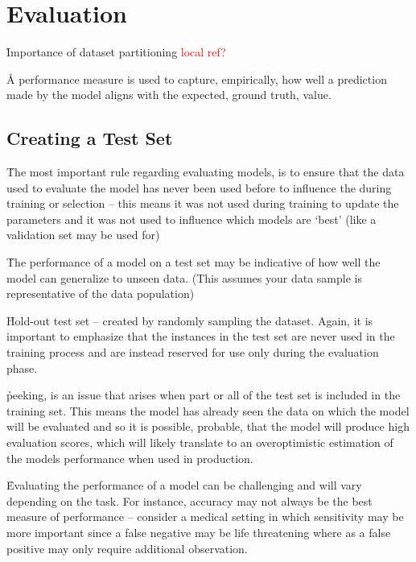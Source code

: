 \section{Evaluation}

\r{Importance of dataset partitioning \textcolor{red}{local ref?}}


\r{A performance measure is used to capture, empirically, how well a prediction made by the model aligns with the expected, ground truth, value.}

\subsection{Creating a Test Set}

\r{The most important rule regarding evaluating models, is to ensure that the data used to evaluate the model has never been used before to influence the during training or selection -- this means it was not used during training to update the parameters and it was not used to influence which models are `best' (like a validation set may be used for)}

\r{The performance of a model on a test set may be indicative of how well the model can generalize to unseen data. (This assumes your data sample is representative of the data population)}

\r{Hold-out test set -- created by randomly sampling the dataset. Again, it is important to emphasize that the instances in the test set are never used in the training process and are instead reserved for use only during the evaluation phase.}

\r{peeking, is an issue that arises when part or all of the test set is included in the training set. This means the model has already seen the data on which the model will be evaluated and so it is possible, probable, that the model will produce high evaluation scores, which will likely translate to an overoptimistic estimation of the models performance when used in production.}

\r{Evaluating the performance of a model can be challenging and will vary depending on the task. For instance, accuracy may not always be the best measure of performance -- consider a medical setting in which sensitivity may be more important since a false negative may be life threatening where as a false positive may only require additional observation.}

